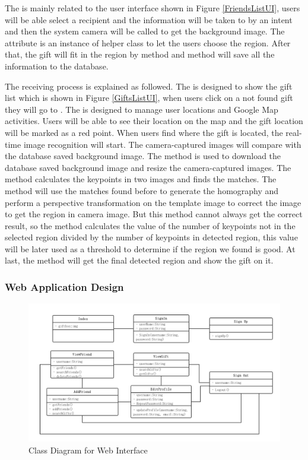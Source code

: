 \par The  is mainly related to the user interface shown in Figure \ref{FriendsListUI}, users will be able select a recipient and the information will be taken to  by an intent and then the system camera will be called to get the background image. The  attribute is an instance of helper class  to let the users choose the region. After that, the gift will fit in the region by  method and  method will save all the information to the database.
\par The receiving process is explained as followed. The  is designed to show the gift list which is shown in Figure \ref{GiftsListUI}, when users click on a not found gift they will go to . The  is designed to manage user locations and Google Map activities. Users will be able to see their location on the map and the gift location will be marked as a red point. When users find where the gift is located, the real-time image recognition will start. The camera-captured images will compare with the database saved background image. The  method is used to download the database saved background image and resize the camera-captured images. The  method calculates the keypoints in two images and finds the matches. The  method will use the matches found before to generate the homography and perform a perspective transformation on the template image to correct the image to get the region in camera image. But this method cannot always get the correct result, so the  method calculates the value of the number of keypoints not in the selected region divided by the number of keypoints in detected region, this value will be later used as a threshold to determine if the region we found is good. At last, the  method will get the final detected region and show the gift on it.

\subsubsection{Web Application Design}
\begin{figure}[htb]
\centering
\includegraphics[width=1\textwidth]{section03/assets/WebClassDiagram.png}
\caption[Class Diagram for Web Interface]{\label{WebClassDiagram}Class Diagram for Web Interface}
\end{figure}
